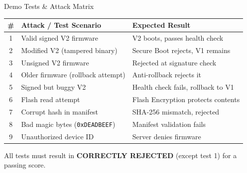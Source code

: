 \documentclass[aspectratio=169]{beamer}
\begin{document}
\begin{frame}{Demo Tests \& Attack Matrix}

\renewcommand{\arraystretch}{1.15}
\begin{table}
\centering
\small
\begin{tabular}{c l l}
\toprule
\textbf{\#} & \textbf{Attack / Test Scenario} & \textbf{Expected Result} \\
\midrule
1 & Valid signed V2 firmware & V2 boots, passes health check \\
2 & Modified V2 (tampered binary) & Secure Boot rejects, V1 remains \\
3 & Unsigned V2 firmware & Rejected at signature check \\
4 & Older firmware (rollback attempt) & Anti-rollback rejects it \\
5 & Signed but buggy V2 & Health check fails, rollback to V1 \\
6 & Flash read attempt & Flash Encryption protects contents \\
\midrule
7 & Corrupt hash in manifest & SHA-256 mismatch, rejected \\
8 & Bad magic bytes (\texttt{0xDEADBEEF}) & Manifest validation fails \\
9 & Unauthorized device ID & Server denies firmware \\
\bottomrule
\end{tabular}
\end{table}

\vspace{4pt}
\centering
All tests must result in \textbf{CORRECTLY REJECTED} (except test 1) for a passing score.

\end{frame}
\end{document}
